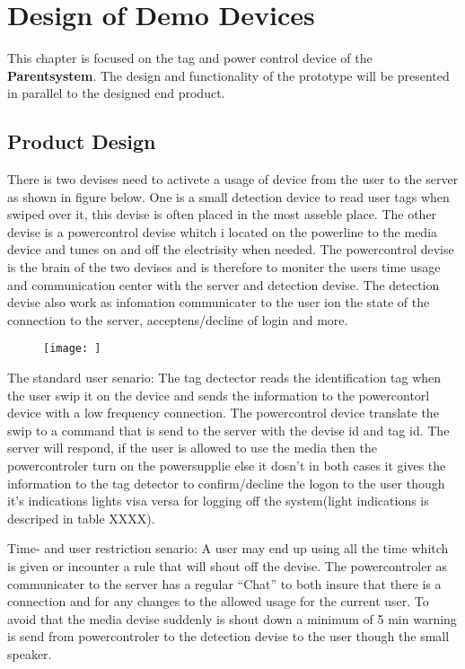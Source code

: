 \chapter{Design of Demo Devices}
This chapter is focused on the tag and power control device of the \textbf{Parentsystem}. 
The design and functionality of the prototype will be presented in parallel to the designed end product.
\section{Product Design}
There is two devises need to activete a usage of device from the user to the server as shown in figure below.
One is a small detection device to read user tags when swiped over it, this devise is often placed in the most asseble place. 
The other devise is a powercontrol devise whitch i located on the powerline to the media device and tunes on and off the electrisity when needed.
The powercontrol devise is the brain of the two devises and is therefore to moniter the users time usage and communication center with the server and detection devise. 
The detection devise also work as infomation communicater to the user ion the state of the connection to the server, acceptens/decline of login and more.     

\begin{figure}
	\centering
		\texttt{[image: ]}
\end{figure}

The standard user senario:
The tag dectector reads the identification tag when the user swip it on the device and sends the information to the powercontorl device with a low frequency connection.
The powercontrol device translate the swip to a command that is send to the server with the devise id and tag id. The server will respond, if the user is allowed to use the media then the powercontroler turn on the powersupplie else it dosn't in both cases it gives the information to the tag detector to confirm/decline the logon to the user though it's indications lights visa versa for logging off the system(light indications is descriped in table XXXX).

Time- and user restriction senario:
A user may end up using all the time whitch is given or incounter a rule that will shout off the devise. The powercontroler as communicater to the server has a regular "`Chat"' to both insure that there is a connection and for any changes to the allowed usage for the current user. To avoid that the media devise suddenly is shout down a minimum of 5 min warning is send from powercontroler to the detection devise to the user though the small speaker. 

